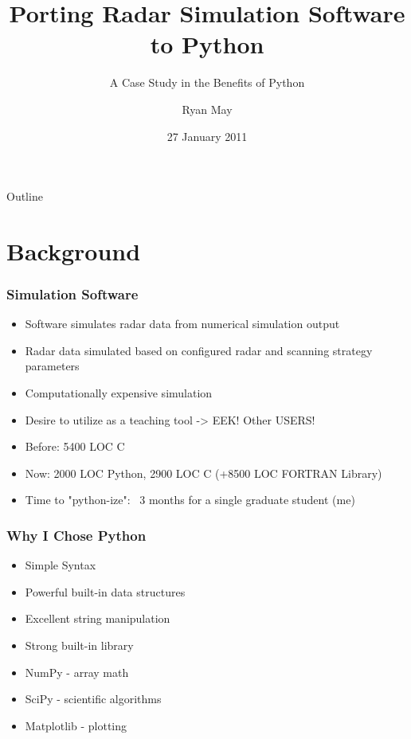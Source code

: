 \documentclass[red, hyperref={pdfpagelabels=false}]{beamer}
\title[Porting Radar Simulation Software DRAFT (\today)]
{Porting Radar Simulation Software to Python}
\subtitle{A Case Study in the Benefits of Python}
\author{Ryan May}
\institute{Enterprise Electronics Corporation}
\date{27 January 2011}
\begin{document}
\frame{\titlepage}

\section[Outline]{}
\begin{frame}{Outline}
    \tableofcontents
\end{frame}

\section{Background}
\begin{frame}
  \frametitle{Simulation Software}
  \begin{itemize}
    \item Software simulates radar data from numerical simulation output
    \item Radar data simulated based on configured radar and scanning strategy parameters
    \item Computationally expensive simulation
    \item Desire to utilize as a teaching tool -> EEK! Other USERS!
    \item Before: 5400 LOC C
    \item Now: 2000 LOC Python, 2900 LOC C (+8500 LOC FORTRAN Library)
    \item Time to "python-ize": ~3 months for a single graduate student (me)
  \end{itemize}
\end{frame}

\begin{frame}
  \frametitle{Why I Chose Python}
  \begin{itemize}
    \item Simple Syntax
    \item Powerful built-in data structures
    \item Excellent string manipulation
    \item Strong built-in library
    \item NumPy - array math
    \item SciPy - scientific algorithms
    \item Matplotlib - plotting
  \end{itemize}
\end{frame}
\end{document}
